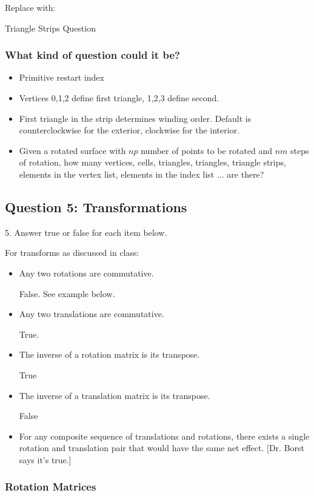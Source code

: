\documentclass[11pt]{article}
\begin{document}
\begin{spacing}{1.2}
Replace with:

Triangle Strips Question

\subsubsection{What kind of question could it be?}

\begin{itemize}
	\item Primitive restart index
	\item Vertices 0,1,2 define first triangle, 1,2,3 define second. 
	\item First triangle in the strip determines winding order.  Default is counterclockwise for the exterior, clockwise for the interior.  
	\item Given a rotated surface with $np$ number of points to be rotated and $nm$ steps of rotation, how many vertices, cells, triangles, triangles, triangle strips, elements in the vertex list, elements in the index list ... are there?
\end{itemize}

\subsection{Question 5:  Transformations}
5.  Answer true or false for each item below.  

For transforms as discussed in class:

\begin{itemize}
	\item Any two rotations are commutative.
	
	False.  See example below. 
	\item Any two translations are commutative.
	
	True.
	\item The inverse of a rotation matrix is its transpose.  
	
	True
	\item The inverse of a translation matrix is its transpose.  
	
	False
	\item For any composite sequence of translations and rotations, there exists a single rotation and translation pair that would have the same net effect.  [Dr. Borst says it's true.]
\end{itemize}

\subsubsection{Rotation Matrices}


\end{spacing}
\end{document}
